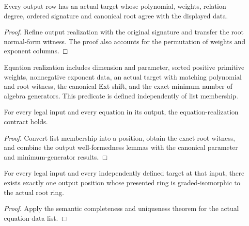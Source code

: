 \begin{theorem}
\label{thm:witness}
\leanok
Every output row has an actual target whose polynomial, weights, relation degree, ordered signature and canonical root agree with the displayed data.
\end{theorem}
\begin{proof}
\leanok
{}
Refine output realization with the original signature and transfer the root normal-form witness. The proof also accounts for the permutation of weights and exponent columns.
\end{proof}

\begin{definition}
\label{def:contract}
\leanok
{}
Equation realization includes dimension and parameter, sorted positive primitive weights, nonnegative exponent data, an actual target with matching polynomial and root witness, the canonical Ext shift, and the exact minimum number of algebra generators. This predicate is defined independently of list membership.
\end{definition}

\begin{theorem}
\label{thm:sound}
\leanok
For every legal input and every equation in its output, the equation-realization contract holds.
\end{theorem}
\begin{proof}
\leanok
{}
Convert list membership into a position, obtain the exact root witness, and combine the output well-formedness lemmas with the canonical parameter and minimum-generator results.
\end{proof}

\begin{theorem}
\label{thm:complete}
\leanok
For every legal input and every independently defined target at that input, there exists exactly one output position whose presented ring is graded-isomorphic to the actual root ring.
\end{theorem}
\begin{proof}
\leanok
{}
Apply the semantic completeness and uniqueness theorem for the actual equation-data list.
\end{proof}

